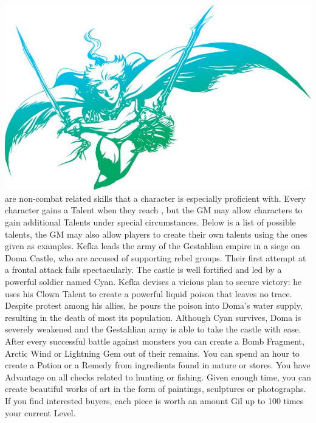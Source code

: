 %
\\
%
\includegraphics[width=\columnwidth]{./art/images/ff3.jpg}
%
\vfill
%
 are non-combat related skills that a character is especially proficient with.
Every character gains a Talent when they reach , but the GM may allow characters to gain additional Talents under special circumstances.
Below is a list of possible talents, the GM may also allow players to create their own talents using the ones given as examples.
%
\ofpar
%
{
	Kefka leads the army of the Gestahlian empire in a siege on Doma Castle, who are accused of supporting rebel groups.
	Their first attempt at a frontal attack fails spectacularly.
	The castle is well fortified and led by a powerful soldier named Cyan.
	Kefka devises a vicious plan to secure victory: 
	he uses his Clown Talent to create a powerful liquid poison that leaves no trace.
	Despite protest among his allies, he pours the poison into Doma's water supply, resulting in the death of most its population.
	Although Cyan survives, Doma is severely weakened and the Gestahlian army is able to take the castle with ease.
}	
%	
\ofpar\vfill
%
{
	After every successful battle against monsters you can create a Bomb Fragment, Arctic Wind or Lightning Gem out of their remains. 
}
\vfill
{}
{
	You can spend an hour to create a Potion or a Remedy from ingredients found in nature or stores.
}
\vfill
{}
{
	You have Advantage on all checks related to hunting or fishing.
}
\vfill
{}
{
	Given enough time, you can create beautiful works of art in the form of paintings, sculptures or photographs.
	If you find interested buyers, each piece is worth an amount Gil up to 100 times your current Level.
}
